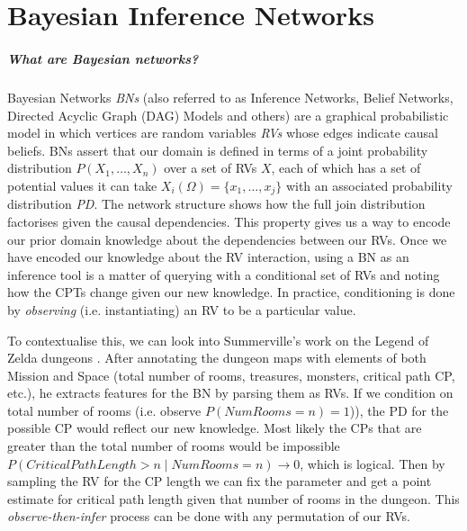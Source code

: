 \documentclass{UoYCSproject}
\begin{document}

\chapter{Bayesian Inference Networks}
\paragraph{What are Bayesian networks?}
Bayesian Networks \textit{BNs} \parencite{pearl1985bayesian} (also referred to as Inference Networks, Belief Networks, Directed Acyclic Graph (DAG) Models and others) are a graphical probabilistic model in which vertices are random variables \textit{RVs} whose edges indicate causal beliefs. BNs assert that our domain is defined in terms of a joint probability distribution \(P(X_1, \ldots , X_n)\) over a set of RVs \(X\), each of which has a set of potential values it can take \(X_i(\Omega) = \{x_1, \ldots, x_j\}\) with an associated probability distribution \textit{PD}. The network structure shows how the full join distribution factorises given the causal dependencies. This property gives us a way to encode our prior domain knowledge about the dependencies between our RVs.
Once we have encoded our knowledge about the RV interaction, using a BN as an inference tool is a matter of querying with a conditional set of RVs and noting how the CPTs change given our new knowledge. In practice, conditioning is done by \textit{observing} (i.e. instantiating) an RV to be a particular value.

To contextualise this, we can look into Summerville's work on the Legend of Zelda dungeons \parencite{SummervilleLearningOfZelda}. After annotating the dungeon maps with elements of both Mission and Space (total number of rooms, treasures, monsters, critical path CP, etc.), he extracts features for the BN by parsing them as RVs. If we condition on total number of rooms (i.e. observe \(P(NumRooms = n) = 1\))), the PD for the possible CP would reflect our new knowledge. Most likely the CPs that are greater than the total number of rooms would be impossible \(P(CriticalPathLength > n \mid NumRooms = n) \rightarrow 0 \), which is logical. Then by sampling the RV for the CP length we can fix the parameter and get a point estimate for critical path length given that number of rooms in the dungeon. This \textit{observe-then-infer} process can be done with any permutation of our RVs.
\end{document}
